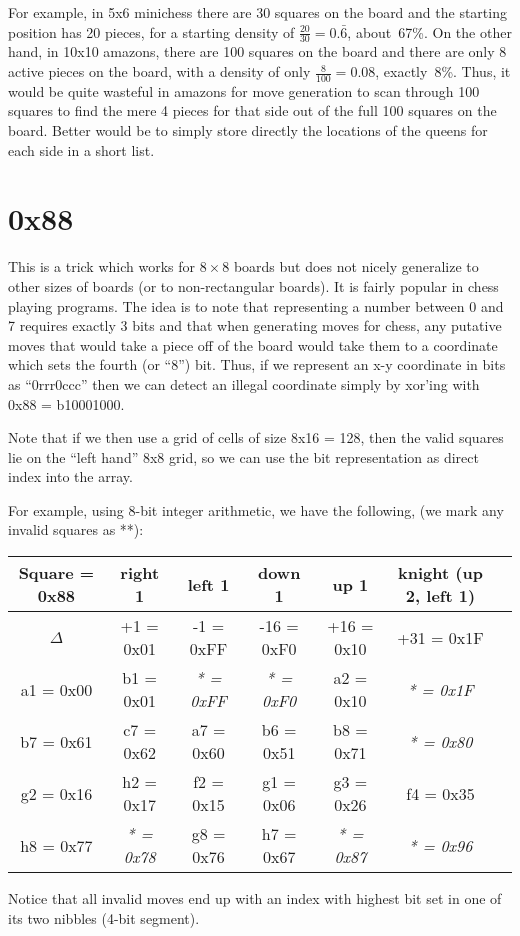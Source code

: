 \documentclass[10pt,dvipdfmx,letterpaper]{report}
\let\x=\times
\begin{document}
For example, in 5x6 minichess there are 30 squares on the board and the starting position has
20 pieces, for a starting density of $\frac{20}{30} = 0.\bar6$, about~67\%.
On the other hand, in 10x10 amazons, there are 100 squares on the board and there are
only 8 active pieces on the board, with a density of only $\frac{8}{100} = 0.08$, exactly~8\%.
Thus, it would be quite wasteful in amazons for move generation to scan through 100 squares to find the
mere 4 pieces for that side out of the full 100 squares on the board.  Better would be to simply
store directly the locations of the queens for each side in a short list.

\section{0x88}
This is a trick which works for $8\x8$ boards but does not
nicely generalize to other sizes of boards (or to non-rectangular boards).
It is fairly popular in chess playing programs.
The idea is to note that representing a number between 0 and 7 requires exactly 3 bits
and that when generating moves for chess, any putative moves that would take a piece off
of the board would take them to a coordinate which sets the fourth (or ``8'') bit.
Thus, if we represent an x-y coordinate in bits as ``0rrr0ccc'' then we can detect an
illegal coordinate simply by xor'ing with 0x88 = b10001000.

Note that if we then use a grid of cells of size 8x16 = 128, then the valid squares lie on
the ``left hand'' 8x8 grid, so we can use the bit representation as direct index into the array.

For example, using 8-bit integer arithmetic, we have the following, (we mark any invalid squares as **):
\begin{center}\begin{tabular}{c|cccccc}
Square = 0x88 & right 1     & left 1    & down 1      & up 1       & knight (up 2, left 1) \\\hline\hline
$\Delta$      &  +1 = 0x01   &  -1 = 0xFF & -16 = 0xF0  & +16 = 0x10 & +31 = 0x1F            \\\hline
a1 = 0x00     &  b1 = 0x01   &\it ** = 0xFF &\it ** = 0xF0  &  a2 = 0x10 &\it ** = 0x1F            \\
b7 = 0x61     &  c7 = 0x62   &  a7 = 0x60 &  b6 = 0x51  &  b8 = 0x71 &\it ** = 0x80            \\
g2 = 0x16     &  h2 = 0x17   &  f2 = 0x15 &  g1 = 0x06  &  g3 = 0x26 &  f4 = 0x35            \\
h8 = 0x77     &\it ** = 0x78   &  g8 = 0x76 &  h7 = 0x67  &\it ** = 0x87 &\it ** = 0x96            \\
\end{tabular}\end{center}
Notice that all invalid moves end up with an index with highest bit set in one of its two nibbles (4-bit segment).
\end{document}
